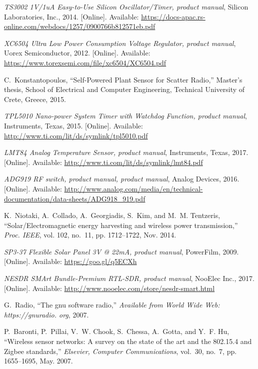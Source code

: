 \documentclass[journal]{IEEEtran}
\begin{document}
\begin{thebibliography}{10}
\BIBentryALTinterwordspacing
\emph{TS3002 1V/1uA Easy-to-Use Silicon Oscillator/Timer, product manual},
  Silicon Laboratories, Inc., 2014. [Online]. Available:
  \url{https://docs-apac.rs-online.com/webdocs/1257/0900766b812571eb.pdf}
\BIBentrySTDinterwordspacing

\BIBentryALTinterwordspacing
\emph{{XC6504} Ultra Low Power Consumption Voltage Regulator, product manual},
  {U}orex {S}emiconductor, 2012. [Online]. Available:
  \url{https://www.torexsemi.com/file/xc6504/XC6504.pdf}
\BIBentrySTDinterwordspacing

C.~Konstantopoulos, ``Self-{P}owered {P}lant {S}ensor for {S}catter {R}adio,''
  Master's thesis, School of Electrical and Computer Engineering, Technical
  University of Crete, Greece, 2015.

\BIBentryALTinterwordspacing
\emph{{TPL5010} Nano-power System Timer with Watchdog Function, product
  manual}, {I}nstruments, {T}exas, 2015. [Online]. Available:
  \url{http://www.ti.com/lit/ds/symlink/tpl5010.pdf}
\BIBentrySTDinterwordspacing

\BIBentryALTinterwordspacing
\emph{{LMT84} Analog Temperature Sensor, product manual}, {I}nstruments,
  {T}exas, 2017. [Online]. Available:
  \url{http://www.ti.com/lit/ds/symlink/lmt84.pdf}
\BIBentrySTDinterwordspacing

\BIBentryALTinterwordspacing
\emph{ADG919 RF switch, product manual, product manual}, {A}nalog {D}evices,
  2016. [Online]. Available:
  \url{http://www.analog.com/media/en/technical-documentation/data-sheets/ADG918\_919.pdf}
\BIBentrySTDinterwordspacing

K.~Niotaki, A.~Collado, A.~Georgiadis, S.~Kim, and M.~M. Tentzeris,
  ``Solar/{E}lectromagnetic energy harvesting and wireless power
  transmission,'' \emph{Proc. {IEEE}}, vol. 102, no.~11, pp. 1712--1722, Nov.
  2014.

\BIBentryALTinterwordspacing
\emph{{SP3-37} {F}lexible {S}olar {P}anel 3{V} @ 22mA, product manual},
  {P}owerFilm, 2009. [Online]. Available: \url{https://goo.gl/q5ECXh}
\BIBentrySTDinterwordspacing

\BIBentryALTinterwordspacing
\emph{{NESDR} {SMA}rt {B}undle-Premium {RTL-SDR}, product manual}, Noo{E}lec
  {I}nc., 2017. [Online]. Available:
  \url{http://www.nooelec.com/store/nesdr-smart.html}
\BIBentrySTDinterwordspacing

G.~Radio, ``The gnu software radio,'' \emph{Available from World Wide Web:
  https://gnuradio. org}, 2007.

P.~Baronti, P.~Pillai, V.~W. Chook, S.~Chessa, A.~Gotta, and Y.~F. Hu,
  ``Wireless sensor networks: A survey on the state of the art and the 802.15.4
  and {Z}igbee standards,'' \emph{Elsevier, Computer Communications}, vol.~30,
  no.~7, pp. 1655--1695, May. 2007.

\end{thebibliography}

\end{document}
